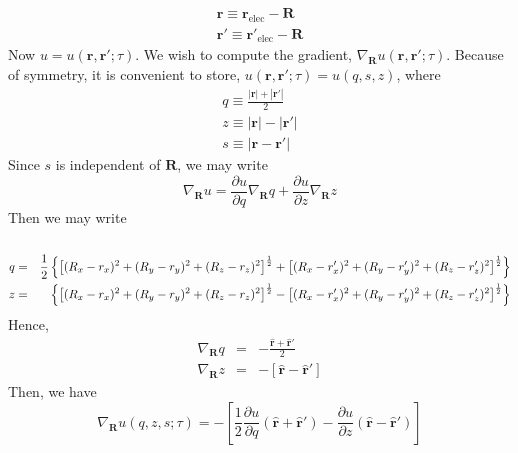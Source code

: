 \documentclass{article}
\newcommand{\vr}{\mathbf{r}}
\newcommand{\vrp}{\mathbf{r}'}
\newcommand{\vR}{\mathbf{R}}
\begin{document}
\begin{eqnarray}
\vr \equiv   \vr_\text{elec} - \vR \\
\vrp \equiv  \vrp_\text{elec} - \vR
\end{eqnarray}
Now $u = u(\vr,\vrp;\tau)$.  We wish to compute the gradient,
$\nabla_\vR u(\vr, \vrp; \tau)$.  Because of symmetry, it is
convenient to store, $u(\vr, \vrp;\tau) = u(q,s,z)$, where
\begin{eqnarray}
q \equiv \frac{|\vr| + |\vrp|}{2} \\
z \equiv |\vr| - |\vrp| \\
s \equiv |\vr - \vrp|
\end{eqnarray}
Since $s$ is independent of $\vR$, we may write
\begin{equation}
\nabla_\vR u = \frac{\partial u}{\partial q} \nabla_\vR q +
\frac{\partial u}{\partial z} \nabla_\vR z
\end{equation}
Then we may write
\begin{eqnarray}
& & \\
q & = & \frac{1}{2} \left\{\left[ (R_x - r_x)^2 + (R_y - r_y)^2 +
  (R_z-r_z)^2\right]^{\frac{1}{2}}+ 
\left[(R_x-r'_x)^2 +(R_y-r'_y)^2 +
  (R_z-r'_z)^2\right]^\frac{1}{2}\right\} \nonumber \\
z & = & \rule{0.26cm}{0.0cm} \left\{\left[ (R_x - r_x)^2 + (R_y - r_y)^2 +
  (R_z-r_z)^2\right]^{\frac{1}{2}}- 
\left[(R_x-r'_x)^2 +(R_y-r'_y)^2 +
  (R_z-r'_z)^2\right]^\frac{1}{2}\right\} \nonumber 
\end{eqnarray}
Hence,
\begin{eqnarray}
  \nabla_\vR q & = & -\frac{\hat{\vr} + \hat{\vr}'}{2} \\
  \nabla_\vR z & = & -\left[\hat{\vr} - \hat{\vr}'\right] 
\end{eqnarray}
Then, we have
\begin{equation}
\nabla_{\vR} u(q,z,s;\tau) = -\left[\frac{1}{2}\frac{\partial u}{\partial q}
\left(\hat{\vr} + \hat{\vr}'\right)
-\frac{\partial u}{\partial z} \left(\hat{\vr} -\hat{\vr}'\right) \right]
\end{equation}
\end{document}

